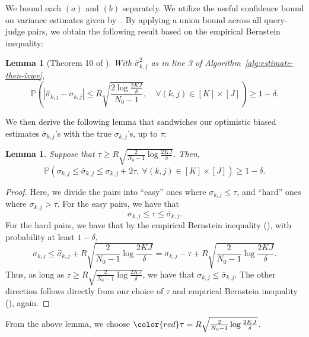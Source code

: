 \documentclass{article}
\def\sP{{\mathbb{P}}}
\theoremstyle{plain}
\newtheorem{lemma}[theorem]{Lemma}
\theoremstyle{definition}
\theoremstyle{plain}
\begin{document}
We bound each $(a)$ and $(b)$ separately.
We utilize the useful confidence bound on variance estimates given by~\citet[Theorem 10]{maurer-pontil}.
By applying a union bound across all query-judge pairs, we obtain the following result based on the empirical Bernstein inequality:
\begin{lemma}[Theorem 10 of \citet{maurer-pontil}]
\label{lem:empirical-bernstein}
    With $\hat{\sigma}_{k,j}^2$ as in line 3 of Algorithm~\ref{alg:estimate-then-ivwe},
    \begin{equation}
        \sP\left( \left| \hat{\sigma}_{k,j} - \sigma_{k,j} \right| \leq R \sqrt{\frac{2 \log\frac{2 K J}{\delta}}{N_0 - 1}}, \quad \forall (k, j) \in [K] \times [J] \right) \geq 1 - \delta.
    \end{equation}
\end{lemma}

We then derive the following lemma that sandwiches our optimistic biased estimates $\overline{\sigma}_{k,j}$'s with the true $\sigma_{k,j}$'s, up to $\tau$:
\begin{lemma}\label{lem:easy-hard}
    Suppose that $\tau \geq R \sqrt{\frac{2}{N_0 - 1} \log\frac{2 K J}{\delta}}$. Then,
    \begin{equation}
        \sP\left( \sigma_{k,j} \leq \overline{\sigma}_{k,j} \leq \sigma_{k,j} + 2 \tau, \ \forall (k, j) \in [K] \times [J] \right) \geq 1 - \delta.
    \end{equation}
\end{lemma}
\begin{proof}
    Here, we divide the pairs into ``easy'' ones where $\sigma_{k,j} \leq \tau$, and ``hard'' ones where $\sigma_{k,j} > \tau$.
    For the easy pairs, we have that
    \begin{equation}
        \sigma_{k,j} \leq \tau \leq \overline{\sigma}_{k,j}.
    \end{equation}
    For the hard pairs, we have that by the empirical Bernstein inequality (), with probability at least $1 - \delta$,
    \begin{equation}
        \sigma_{k,j} \leq \hat{\sigma}_{k,j} + R \sqrt{\frac{2}{N_0 - 1} \log\frac{2 K J}{\delta}} = \overline{\sigma}_{k,j} - \tau + R \sqrt{\frac{2}{N_0 - 1} \log\frac{2 K J}{\delta}}.
    \end{equation}
    Thus, as long as $\tau \geq R \sqrt{\frac{2}{N_0 - 1} \log\frac{2 K J}{\delta}}$, we have that $\sigma_{k,j} \leq \overline{\sigma}_{k,j}$.
    The other direction follows directly from our choice of $\tau$ and empirical Bernstein inequality (), again.
\end{proof}
From the above lemma, we choose $\color{red}\tau = R \sqrt{\frac{2}{N_0 - 1} \log\frac{2 K J}{\delta}}$.
\end{document}
